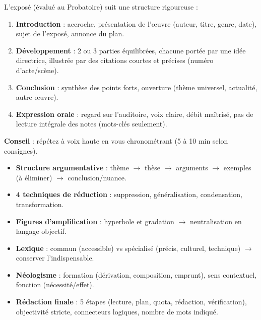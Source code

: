 \documentclass[11pt]{article}
\begin{document}
\begin{methode}
L'exposé (évalué au Probatoire) suit une structure rigoureuse :
\begin{enumerate}
\item \textbf{Introduction} : accroche, présentation de l'œuvre (auteur, titre, genre, date), sujet de l'exposé, annonce du plan.
\item \textbf{Développement} : 2 ou 3 parties équilibrées, chacune portée par une idée directrice, illustrée par des citations courtes et précises (numéro d'acte/scène).
\item \textbf{Conclusion} : synthèse des points forts, ouverture (thème universel, actualité, autre œuvre).
\item \textbf{Expression orale} : regard sur l'auditoire, voix claire, débit maîtrisé, pas de lecture intégrale des notes (mots-clés seulement).
\end{enumerate}
\textbf{Conseil} : répétez à voix haute en vous chronométrant (5 à 10 min selon consignes).
\end{methode}

\begin{aretenir}
\begin{itemize}
\item \textbf{Structure argumentative} : thème $\rightarrow$ thèse $\rightarrow$ arguments $\rightarrow$ exemples (à éliminer) $\rightarrow$ conclusion/nuance.
\item \textbf{4 techniques de réduction} : suppression, généralisation, condensation, transformation.
\item \textbf{Figures d'amplification} : hyperbole et gradation $\rightarrow$ neutralisation en langage objectif.
\item \textbf{Lexique} : commun (accessible) vs spécialisé (précis, culturel, technique) $\rightarrow$ conserver l'indispensable.
\item \textbf{Néologisme} : formation (dérivation, composition, emprunt), sens contextuel, fonction (nécessité/effet).
\item \textbf{Rédaction finale} : 5 étapes (lecture, plan, quota, rédaction, vérification), objectivité stricte, connecteurs logiques, nombre de mots indiqué.
\end{itemize}
\end{aretenir}
\end{document}
